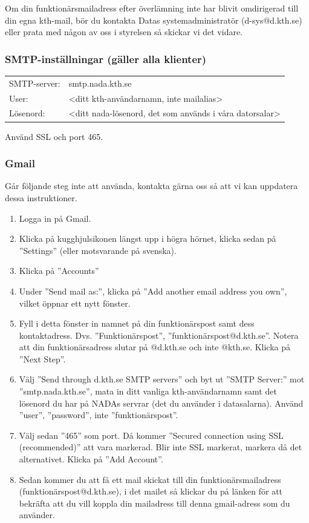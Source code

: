 \documentclass[a4paper,11pt]{article}
\begin{document}
Om din funktionärsmailadress efter överlämning inte har blivit omdirigerad till din egna kth-mail, bör du kontakta Datas systemadministratör (d-sys@d.kth.se) eller prata med någon av oss i styrelsen så skickar vi det vidare.

\subsubsection{SMTP-inställningar (gäller alla klienter)}
\begin{table}[!th]
\begin{tabular}{ll}

SMTP-server: & smtp.nada.kth.se \\
User: &<ditt kth-användarnamn, inte mailalias>\\
Lösenord: & <ditt nada-lösenord, det som används i våra datorsalar>\\

\end{tabular}
\end{table}

\noindent Använd SSL och port 465.

\subsubsection{Gmail}
\small Går följande steg inte att använda, kontakta gärna oss så att vi kan uppdatera dessa instruktioner.

\begin{enumerate}
\item Logga in på Gmail.
\item Klicka på kugghjulsikonen längst upp i högra hörnet, klicka sedan på ''Settings'' (eller motsvarande på svenska).
\item Klicka på ''Accounts''
\item Under ''Send mail as:'', klicka på ''Add another email address you own'', vilket öppnar ett nytt fönster.
\item Fyll i detta fönster in namnet på din funktionärspost samt dess kontaktadress. Dvs. ''Funktionärspost'', ''funktionärspost@d.kth.se''. Notera att din funktionärsadress slutar på @d.kth.se och inte @kth.se. Klicka på ''Next Step''.
\item Välj ''Send through d.kth.se SMTP servers'' och byt ut ''SMTP Server:'' mot ''smtp.nada.kth.se'', mata in ditt vanliga kth-användarnamn samt det lösenord du har på NADAs servrar (det du använder i datasalarna). Använd ''user'', ''password'', inte ''funktionärspost''.
\item Välj sedan ''465'' som port. Då kommer ''Secured connection using SSL (recommended)'' att vara markerad. Blir inte SSL markerat, markera då det alternativet. Klicka på ''Add Account''.
\item Sedan kommer du att få ett mail skickat till din funktionärsmailadress (funktionärspost@d.kth.se), i det mailet så klickar du på länken för att bekräfta att du vill koppla din mailadress till denna gmail-adress som du använder.
\end{enumerate}
\end{document}
